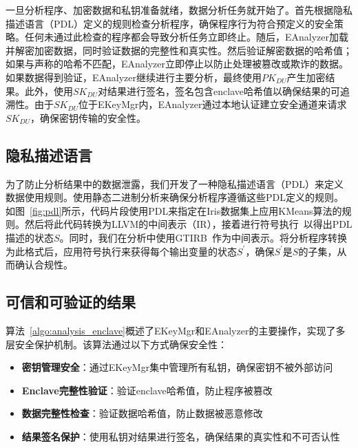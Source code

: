 一旦分析程序、加密数据和私钥准备就绪，数据分析任务就开始了。首先根据隐私描述语言（PDL）定义的规则检查分析程序，确保程序行为符合预定义的安全策略。任何未通过此检查的程序都会导致分析任务立即终止。随后，EAnalyzer加载并解密加密数据，同时验证数据的完整性和真实性。然后验证解密数据的哈希值；如果与声称的哈希不匹配，EAnalyzer立即停止以防止处理被篡改或欺诈的数据。如果数据得到验证，EAnalyzer继续进行主要分析，最终使用$PK_{DU}$产生加密结果。此外，使用$SK_{DU}$对结果进行签名，签名包含enclave哈希值以确保结果的可追溯性。由于$SK_{DU}$位于EKeyMgr内，EAnalyzer通过本地认证建立安全通道来请求$SK_{DU}$，确保密钥传输的安全性。


\subsection{隐私描述语言}
为了防止分析结果中的数据泄露，我们开发了一种隐私描述语言（PDL）来定义数据使用规则。使用静态二进制分析来确保分析程序遵循这些PDL定义的规则。如图~\ref{fig:pdl}所示，代码片段使用PDL来指定在Iris数据集上应用KMeans算法的规则。然后将此代码转换为LLVM的中间表示（IR），接着进行符号执行~\cite{king1976symbolic,baldoni2018survey}以得出PDL描述的状态$S$。同时，我们在分析中使用GTIRB~\cite{schulte2019gtirb}作为中间表示。将分析程序转换为此格式后，应用符号执行来获得每个输出变量的状态$S^{\prime}$，确保$S^{\prime}$是$S$的子集，从而确认合规性。

\subsection{可信和可验证的结果}
算法~\ref{algo:analysis_enclave}概述了EKeyMgr和EAnalyzer的主要操作，实现了多层安全保护机制。该算法通过以下方式确保安全性：

\begin{itemize}
    \item \textbf{密钥管理安全}：通过EKeyMgr集中管理所有私钥，确保密钥不被外部访问
    \item \textbf{Enclave完整性验证}：验证enclave哈希值，防止程序被篡改
    \item \textbf{数据完整性检查}：验证数据哈希值，防止数据被恶意修改
    \item \textbf{结果签名保护}：使用私钥对结果进行签名，确保结果的真实性和不可否认性
\end{itemize}

